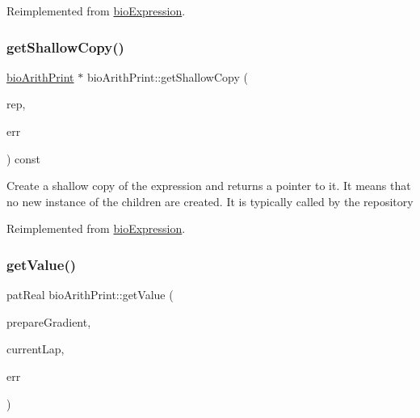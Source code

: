 Reimplemented from \hyperlink{classbio_expression_a2353a4afb3a2b0af7c63aba086a72bde}{bio\+Expression}.

\mbox{\label{classbio_arith_print_ac6387b4dbe1741adbc9343cef406b0c0}} 
\subsubsection{\texorpdfstring{get\+Shallow\+Copy()}{getShallowCopy()}}
{\footnotesize\ttfamily \hyperlink{classbio_arith_print}{bio\+Arith\+Print} $\ast$ bio\+Arith\+Print\+::get\+Shallow\+Copy (\begin{DoxyParamCaption}\item[{\hyperlink{classbio_expression_repository}{bio\+Expression\+Repository} $\ast$}]{rep,  }\item[{pat\+Error $\ast$\&}]{err }\end{DoxyParamCaption}) const\hspace{0.3cm}{\ttfamily [virtual]}}

Create a shallow copy of the expression and returns a pointer to it. It means that no new instance of the children are created. It is typically called by the repository 

Reimplemented from \hyperlink{classbio_expression_a442534762693b92baaf33928979a1bf8}{bio\+Expression}.

\mbox{\label{classbio_arith_print_a6c49bec841cdebd07ae234896c6d5416}} 
\subsubsection{\texorpdfstring{get\+Value()}{getValue()}}
{\footnotesize\ttfamily pat\+Real bio\+Arith\+Print\+::get\+Value (\begin{DoxyParamCaption}\item[{pat\+Boolean}]{prepare\+Gradient,  }\item[{pat\+U\+Long}]{current\+Lap,  }\item[{pat\+Error $\ast$\&}]{err }\end{DoxyParamCaption})\hspace{0.3cm}{\ttfamily [virtual]}}

